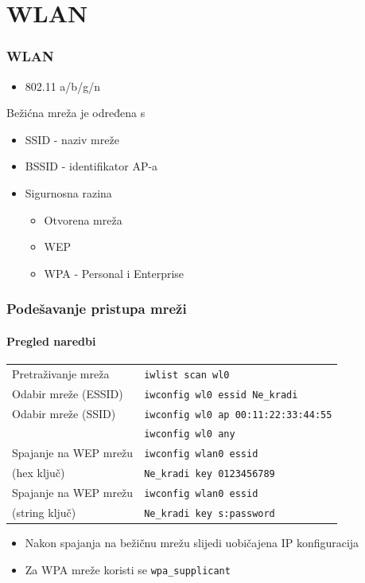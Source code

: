 \documentclass[t,table,usenames,dvipsnames]{beamer}
\begin{document}
\section{WLAN}
\begin{frame}
	\frametitle{WLAN}
	\begin{itemize}
		\item 802.11 a/b/g/n
	\end{itemize}
	Bežićna mreža je određena s
	\begin{itemize}
		\item SSID - naziv mreže
		\item BSSID - identifikator AP-a
		\item Sigurnosna razina
		\begin{itemize}
			\item Otvorena mreža
			\item WEP
			\item WPA - Personal i Enterprise
		\end{itemize}
	\end{itemize}
\end{frame}

\begin{frame}
	\frametitle{Podešavanje pristupa mreži}
	\framesubtitle{Pregled naredbi}
	\begin{table}[h]
		\begin{tabular}{l l}
			Pretraživanje mreža & \texttt{iwlist scan wl0}\\
			Odabir mreže (ESSID) & \texttt{iwconfig wl0 essid Ne\_kradi}\\
			Odabir mreže (SSID) & \texttt{iwconfig wl0 ap 00:11:22:33:44:55}\\
			& \texttt{iwconfig wl0 any}\\
			
			Spajanje na WEP mrežu & \texttt{iwconfig wlan0 essid}\\
			\hspace{1em} (hex ključ) & \hspace{1em} \texttt{Ne\_kradi key 0123456789}\\
			
			Spajanje na WEP mrežu & \texttt{iwconfig wlan0 essid}\\
			\hspace{1em} (string ključ) & \hspace{1em} \texttt{Ne\_kradi key s:password}
			
		\end{tabular}
	\end{table}
	
	\begin{itemize}
		\item Nakon spajanja na bežičnu mrežu slijedi uobičajena IP konfiguracija
		\item Za WPA mreže koristi se \texttt{wpa\_supplicant}
	\end{itemize}
\end{frame}
\end{document}
